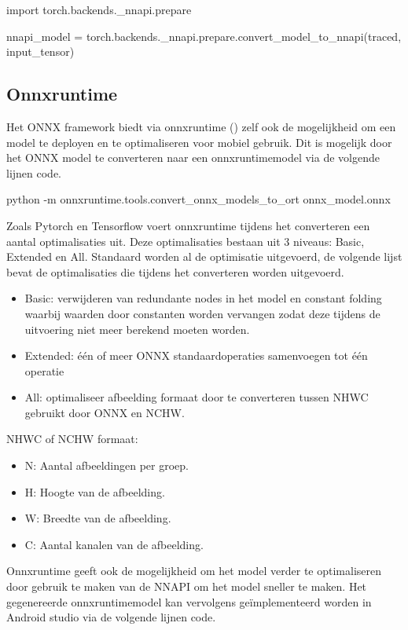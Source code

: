 \begin{python}
import torch.backends._nnapi.prepare

nnapi_model = torch.backends._nnapi.prepare.convert_model_to_nnapi(traced, input_tensor)
\end{python}

\subsection{Onnxruntime}
Het ONNX framework biedt via onnxruntime (\cite{onnx_onnxruntime_2019}) zelf ook de mogelijkheid om een model te deployen en te optimaliseren voor mobiel gebruik.
Dit is mogelijk door het ONNX model te converteren naar een onnxruntimemodel via de volgende lijnen code.

\begin{python}
python -m onnxruntime.tools.convert_onnx_models_to_ort onnx_model.onnx
\end{python}

Zoals Pytorch en Tensorflow voert onnxruntime tijdens het converteren een aantal optimalisaties uit.
Deze optimalisaties bestaan uit 3 niveaus: Basic, Extended en All.
Standaard worden al de optimisatie uitgevoerd, de volgende lijst bevat de optimalisaties die tijdens het converteren worden uitgevoerd.

\begin{itemize}
	\item Basic: verwijderen van redundante nodes in het model en constant folding waarbij waarden door constanten worden vervangen zodat deze tijdens de uitvoering niet meer berekend moeten worden.
	\item Extended: \'e\'en of meer ONNX standaardoperaties samenvoegen tot \'e\'en operatie 
	\item All: optimaliseer afbeelding formaat door te converteren tussen NHWC gebruikt door ONNX en NCHW.
\end{itemize}

NHWC of NCHW formaat: 

\begin{itemize}
	\item N: Aantal afbeeldingen per groep.
	\item H: Hoogte van de afbeelding.
	\item W: Breedte van de afbeelding.
	\item C: Aantal kanalen van de afbeelding.
\end{itemize}

Onnxruntime geeft ook de mogelijkheid om het model verder te optimaliseren door gebruik te maken van de NNAPI om het model sneller te maken.
Het gegenereerde onnxruntimemodel kan vervolgens ge\"implementeerd worden in Android studio via de volgende lijnen code.

